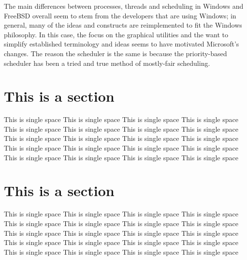 \documentclass[titlepage]{article}
\begin{document}
\begin{singlespace}
    The main differences between processes, threads and scheduling in Windows and FreeBSD overall seem to stem from the developers that are using Windows; in general, many of the ideas and constructs are reimplemented to fit the Windows philosophy. In this case, the focus on the graphical utilities and the want to simplify established terminology and ideas seems to have motivated Microsoft’s changes. The reason the scheduler is the same is because the priority-based scheduler has been a tried and true method of mostly-fair scheduling.\\

 
\end{singlespace}

\section{This is a section}
\begin{singlespace}
This is single space This is single space This is single space This is single space This is single space This is single space This is single space This is single space  This is single space This is single space This is single space This is single space  This is single space This is single space This is single space This is single space  This is single space This is single space This is single space This is single space  
\end{singlespace}

\section{This is a section}
\begin{singlespace}
This is single space This is single space This is single space This is single space This is single space This is single space This is single space This is single space  This is single space This is single space This is single space This is single space  This is single space This is single space This is single space This is single space  This is single space This is single space This is single space This is single space  
\end{singlespace}

\newpage


\end{document}
